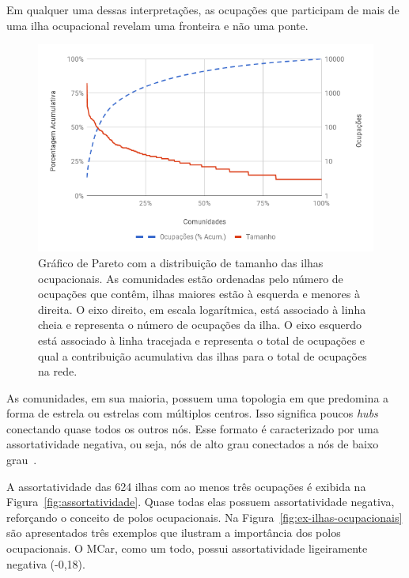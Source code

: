 \documentclass[12pt,a4paper]{article}
\begin{document}
Em qualquer uma dessas interpretações, as ocupações que participam de mais de uma ilha ocupacional revelam uma fronteira e não uma ponte.

\begin{figure}[htb]
    \centering
    \includegraphics[width=0.9\linewidth]{pareto-comunidades.png}
    \caption{Gráfico de Pareto com a distribuição de tamanho das ilhas ocupacionais. As comunidades estão ordenadas pelo número de ocupações que contêm, ilhas maiores estão à esquerda e menores à direita. O eixo direito, em escala logarítmica, está associado à linha cheia e representa o número de ocupações da ilha. O eixo esquerdo está associado à linha tracejada e representa o total de ocupações e qual a contribuição acumulativa das ilhas para o total de ocupações na rede.}
    \label{fig:pareto-comunidades}
\end{figure}

As comunidades, em sua maioria, possuem uma topologia em que predomina a forma de estrela ou estrelas com múltiplos centros. Isso significa poucos \textit{hubs} conectando quase todos os outros nós. Esse formato é caracterizado por uma assortatividade negativa, ou seja, nós de alto grau conectados a nós de baixo grau~\cite{Barabasi2016-rn}.

A assortatividade das 624 ilhas com ao menos três ocupações é exibida na Figura~\ref{fig:assortatividade}. Quase todas elas possuem assortatividade negativa, reforçando o conceito de polos ocupacionais. Na Figura~\ref{fig:ex-ilhas-ocupacionais} são apresentados três exemplos que ilustram a importância dos polos ocupacionais. O MCar, como um todo, possui assortatividade ligeiramente negativa (-0,18).
\end{document}
